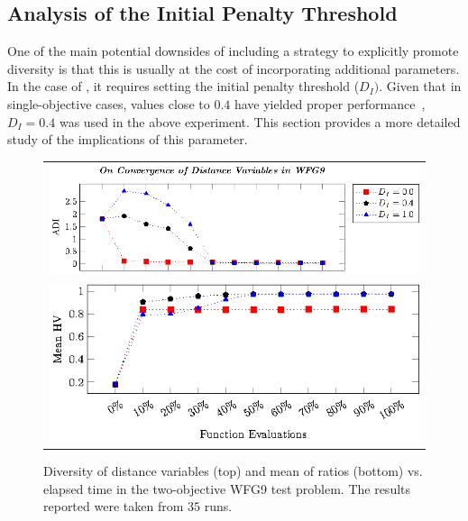 \subsection{Analysis of the Initial Penalty Threshold}

One of the main potential downsides of including a strategy to explicitly promote diversity 
is that this is usually at the cost of incorporating additional parameters.
%
In the case of \AVSDMOEAD{}, it requires setting the initial penalty threshold ($D_I)$.
%
Given that in single-objective cases, values close to $0.4$ have yielded proper performance~\cite{romero2018memetic,castillo2019differential},
$D_I = 0.4$ was used in the above experiment.
%
This section provides a more detailed study of the implications of this parameter.
%

\begin{figure}[t]
\centering
\begin{tabular}{l}
 \includegraphics[scale=0.75]{images/Diversity_Long_Term_tikz_WFG9-figure0.eps}\\[0cm]%
 \includegraphics[scale=0.75]{images/Diversity_Long_Term_tikz_WFG9-figure1.eps}\\[0cm]%
\end{tabular}
\caption{Diversity of distance variables (top) and mean of \HV{} ratios (bottom) vs. elapsed time in the two-objective WFG9 test problem. The results reported were taken from $35$ runs.}\label{fig:WFG9_Diversity}
\end{figure}



